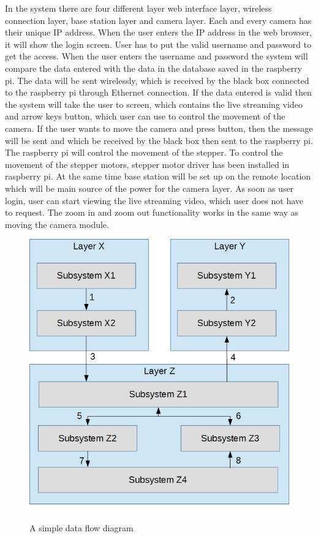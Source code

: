 In the system there are four different layer web interface layer, wireless connection layer, base station layer and camera layer. Each and every camera has their unique IP address. When the user enters the IP address in the web browser, it will show the login screen. User has to put the valid username and password to get the access. When the user enters the username and password the system will compare the data entered with the data in the database saved in the raspberry pi. The data will be sent wirelessly, which is received by the black box connected to the raspberry pi through Ethernet connection. If the data entered is valid then the system will take the user to screen, which contains the live streaming video and arrow keys button, which user can use to control the movement of the camera. If the user wants to move the camera and press button, then the message will be sent and which be received by the black box then sent to the raspberry pi. The raspberry pi will control the movement of the stepper. To control the movement of the stepper motors, stepper motor driver has been installed in raspberry pi. At the same time base station will be set up on the remote location which will be main source of the power for the camera layer. As soon as user login, user can start viewing the live streaming video, which user does not have to request. The zoom in and zoom out functionality works in the same way as moving the camera module.


\begin{figure}[h!]
	\centering
 	\includegraphics[width=\textwidth]{images/data_flow}
 \caption{A simple data flow diagram}
\end{figure}
